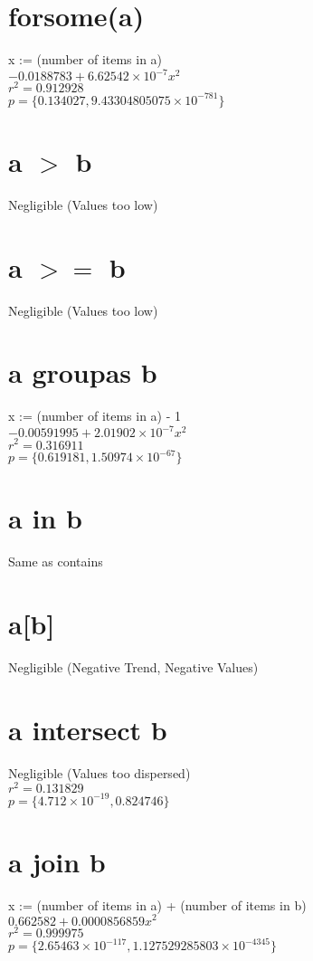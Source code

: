 \documentclass[12pt]{article}
\begin{document}
	\section{forsome(a)}
	x := (number of items in a)\\
	$-0.0188783 + 6.62542 \times 10^{-7} x^2$\\
	$r^2 = 0.912928$\\
	$p = \{0.134027, 9.43304805075 \times 10^{-781}\}$
	
	\section{a $>$ b}
	Negligible (Values too low)
	
	\section{a $>=$ b}
	Negligible (Values too low)
	
	\section{a groupas b}
	x := (number of items in a) - 1\\
	$-0.00591995 + 2.01902 \times 10^{-7} x^2$\\
	$r^2 = 0.316911$\\
	$p = \{0.619181, 1.50974 \times 10^{-67}\}$
	
	\section{a in b}
	Same as contains
	
	\section{a[b]}
	Negligible (Negative Trend, Negative Values)
	
	\section{a intersect b}
	Negligible (Values too dispersed)\\
	$r^2 = 0.131829$\\
	$p = \{4.712 \times 10^{-19}, 0.824746\}$ %
	
	\section{a join b}
	x := (number of items in a) + (number of items in b)\\
	$0.662582 + 0.0000856859 x^2$\\
	$r^2 = 0.999975$\\
	$p = \{2.65463 \times 10^{-117}, 1.127529285803 \times 10^{-4345}\}$
	
\end{document}
